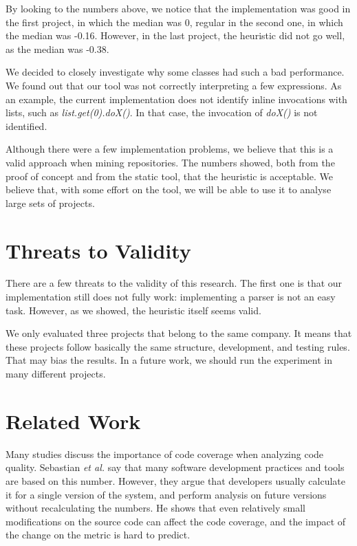 \documentclass{sig-alternate}
\begin{document}
By looking to the numbers above, we notice that the implementation was good in the first project,
in which the median was 0, regular in the second one, in which the median was -0.16. However,
in the last project, the heuristic did not go well, as the median was -0.38.

We decided to closely investigate why some classes had such a bad performance. We found out
that our tool was not correctly interpreting a few expressions. As an example, 
the current implementation does not identify inline invocations with lists, such
as \textit{list.get(0).doX()}. In that case, the invocation of \textit{doX()} is not identified.

Although there were a few implementation problems, we believe that this is a valid approach
when mining repositories. The numbers showed, both from the proof of concept and from the
static tool, that the heuristic is acceptable. We believe that, with some effort on the tool,
we will be able to use it to analyse large sets of projects.


\section{Threats to Validity}
\label{sec-threats}

There are a few threats to the validity of this research. The first one is that our implementation
still does not fully work: implementing a parser is not an easy task. However, as we showed, the 
heuristic itself seems valid. 

We only evaluated three projects that belong to the same company. It means that these projects
follow basically the same structure, development, and testing rules. That may bias the results.
In a future work, we should run the experiment in many different projects.

\section{Related Work}
\label{sec-related-work}

Many studies discuss the importance of code coverage when analyzing code quality. 
Sebastian \textit{et al.} \cite{sebastian} say that many software development practices and tools
are based on this number. However, they argue that developers usually calculate it for a single
version of the system, and perform analysis on future versions without recalculating the numbers.
He shows that even relatively small modifications on the source code can affect the code coverage, 
and the impact of the change on the metric is hard to predict.
\end{document}
